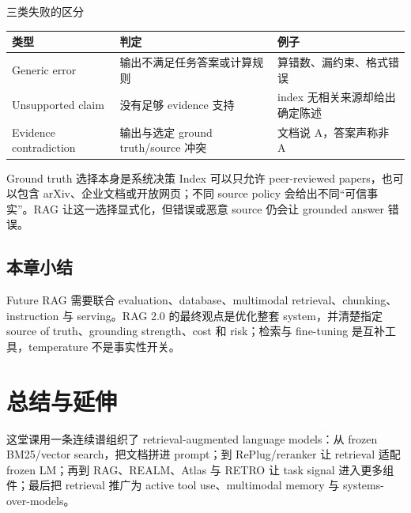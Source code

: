 \documentclass[a4paper]{article}
\begin{document}
\begin{importantbox}{三类失败的区分}
\begin{tabularx}{\textwidth}{L{0.20\textwidth}>{\raggedright\arraybackslash}X >{\raggedright\arraybackslash}X}
\toprule
类型 & 判定 & 例子 \\
\midrule
Generic error & 输出不满足任务答案或计算规则 & 算错数、漏约束、格式错误 \\
Unsupported claim & 没有足够 evidence 支持 & index 无相关来源却给出确定陈述 \\
Evidence contradiction & 输出与选定 ground truth/source 冲突 & 文档说 A，答案声称非 A \\
\bottomrule
\end{tabularx}
\end{importantbox}

\begin{warningbox}{Ground truth 选择本身是系统决策}
Index 可以只允许 peer-reviewed papers，也可以包含 arXiv、企业文档或开放网页；不同 source policy 会给出不同“可信事实”。RAG 让这一选择显式化，但错误或恶意 source 仍会让 grounded answer 错误。
\end{warningbox}



\subsection{本章小结}

Future RAG 需要联合 evaluation、database、multimodal retrieval、chunking、instruction 与 serving。RAG 2.0 的最终观点是优化整套 system，并清楚指定 source of truth、grounding strength、cost 和 risk；检索与 fine-tuning 是互补工具，temperature 不是事实性开关。

\section{总结与延伸}

这堂课用一条连续谱组织了 retrieval-augmented language models：从 frozen BM25/vector search，把文档拼进 prompt；到 RePlug/reranker 让 retrieval 适配 frozen LM；再到 RAG、REALM、Atlas 与 RETRO 让 task signal 进入更多组件；最后把 retrieval 推广为 active tool use、multimodal memory 与 systems-over-models。
\end{document}
